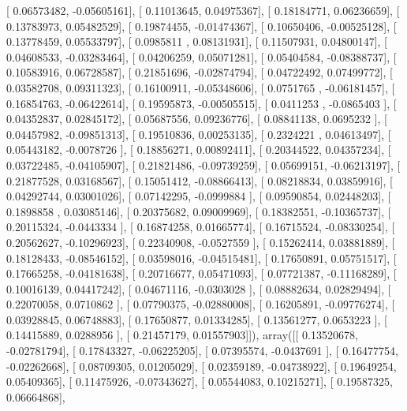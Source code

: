 \documentclass{article}
\begin{document}
       [ 0.06573482, -0.05605161],
       [ 0.11013645,  0.04975367],
       [ 0.18184771,  0.06236659],
       [ 0.13783973,  0.05482529],
       [ 0.19874455, -0.01474367],
       [ 0.10650406, -0.00525128],
       [ 0.13778459,  0.05533797],
       [ 0.0985811 ,  0.08131931],
       [ 0.11507931,  0.04800147],
       [ 0.04608533, -0.03283464],
       [ 0.04206259,  0.05071281],
       [ 0.05404584, -0.08388737],
       [ 0.10583916,  0.06728587],
       [ 0.21851696, -0.02874794],
       [ 0.04722492,  0.07499772],
       [ 0.03582708,  0.09311323],
       [ 0.16100911, -0.05348606],
       [ 0.0751765 , -0.06181457],
       [ 0.16854763, -0.06422614],
       [ 0.19595873, -0.00505515],
       [ 0.0411253 , -0.0865403 ],
       [ 0.04352837,  0.02845172],
       [ 0.05687556,  0.09236776],
       [ 0.08841138,  0.0695232 ],
       [ 0.04457982, -0.09851313],
       [ 0.19510836,  0.00253135],
       [ 0.2324221 ,  0.04613497],
       [ 0.05443182, -0.0078726 ],
       [ 0.18856271,  0.00892411],
       [ 0.20344522,  0.04357234],
       [ 0.03722485, -0.04105907],
       [ 0.21821486, -0.09739259],
       [ 0.05699151, -0.06213197],
       [ 0.21877528,  0.03168567],
       [ 0.15051412, -0.08866413],
       [ 0.08218834,  0.03859916],
       [ 0.04292744,  0.03001026],
       [ 0.07142295, -0.0999884 ],
       [ 0.09590854,  0.02448203],
       [ 0.1898858 ,  0.03085146],
       [ 0.20375682,  0.09009969],
       [ 0.18382551, -0.10365737],
       [ 0.20115324, -0.0443334 ],
       [ 0.16874258,  0.01665774],
       [ 0.16715524, -0.08330254],
       [ 0.20562627, -0.10296923],
       [ 0.22340908, -0.0527559 ],
       [ 0.15262414,  0.03881889],
       [ 0.18128433, -0.08546152],
       [ 0.03598016, -0.04515481],
       [ 0.17650891,  0.05751517],
       [ 0.17665258, -0.04181638],
       [ 0.20716677,  0.05471093],
       [ 0.07721387, -0.11168289],
       [ 0.10016139,  0.04417242],
       [ 0.04671116, -0.0303028 ],
       [ 0.08882634,  0.02829494],
       [ 0.22070058,  0.0710862 ],
       [ 0.07790375, -0.02880008],
       [ 0.16205891, -0.09776274],
       [ 0.03928845,  0.06748883],
       [ 0.17650877,  0.01334285],
       [ 0.13561277,  0.0653223 ],
       [ 0.14415889,  0.0288956 ],
       [ 0.21457179,  0.01557903]]), array([[ 0.13520678, -0.02781794],
       [ 0.17843327, -0.06225205],
       [ 0.07395574, -0.0437691 ],
       [ 0.16477754, -0.02262668],
       [ 0.08709305,  0.01205029],
       [ 0.02359189, -0.04738922],
       [ 0.19649254,  0.05409365],
       [ 0.11475926, -0.07343627],
       [ 0.05544083,  0.10215271],
       [ 0.19587325,  0.06664868],
\end{document}
